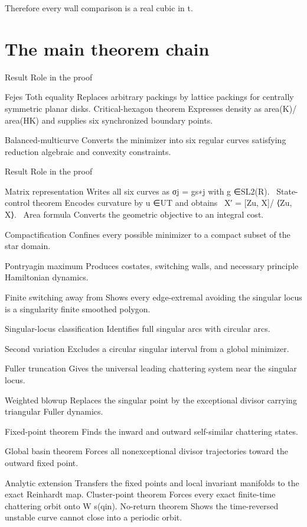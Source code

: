 Therefore every wall comparison is a real cubic in t.


\section{The main theorem chain}

Result Role in the proof


Fejes Toth equality Replaces arbitrary packings by lattice packings for centrally symmetric planar disks. Critical-hexagon theorem Expresses density as area(K)/ area(HK) and supplies six synchronized boundary points.


Balanced-multicurve Converts the minimizer into six regular curves satisfying reduction algebraic and convexity constraints.


Result Role in the proof


\begin{displaytext}
Matrix representation Writes all six curves as σj = gs∗j with g ∈SL2(R). \
State-control theorem Encodes curvature by u ∈UT and obtains \
X′ = [Zu, X]/ ⟨Zu, X⟩. \
Area formula Converts the geometric objective to an integral cost.
\end{displaytext}

Compactification Confines every possible minimizer to a compact subset of the star domain.


Pontryagin maximum Produces costates, switching walls, and necessary principle Hamiltonian dynamics.


Finite switching away from Shows every edge-extremal avoiding the singular locus is a singularity finite smoothed polygon.


Singular-locus classification Identifies full singular arcs with circular arcs.


Second variation Excludes a circular singular interval from a global minimizer.


Fuller truncation Gives the universal leading chattering system near the singular locus.


Weighted blowup Replaces the singular point by the exceptional divisor carrying triangular Fuller dynamics.


Fixed-point theorem Finds the inward and outward self-similar chattering states.


Global basin theorem Forces all nonexceptional divisor trajectories toward the outward fixed point.


Analytic extension Transfers the fixed points and local invariant manifolds to the exact Reinhardt map. Cluster-point theorem Forces every exact finite-time chattering orbit onto W s(qin). No-return theorem Shows the time-reversed unstable curve cannot close into a periodic orbit.


